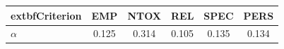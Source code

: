 \begin{tabular}{lccccc}
\toprule
	extbf{Criterion} & EMP & NTOX & REL & SPEC & PERS \\
\midrule
\textbf{$\alpha$} & 0.125 & 0.314 & 0.105 & 0.135 & 0.134 \\
\bottomrule
\end{tabular}
